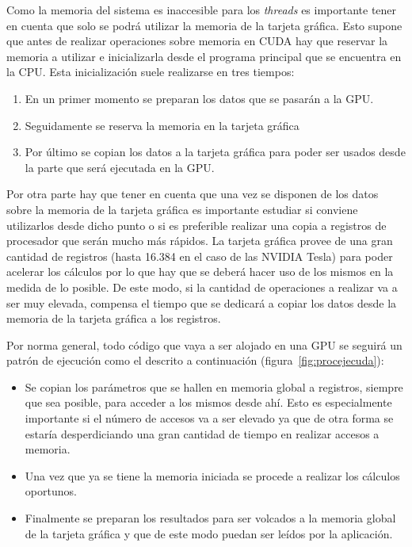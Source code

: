 Como la memoria del sistema es inaccesible para los \emph{threads} es importante tener en cuenta que solo se podrá utilizar la memoria de la tarjeta gráfica. Esto supone que antes de realizar operaciones sobre memoria en CUDA hay que reservar la memoria a utilizar e inicializarla desde el programa principal que se encuentra en la CPU. Esta inicialización suele realizarse en tres tiempos:

\begin{enumerate}
	\item En un primer momento se preparan los datos que se pasarán a la GPU.

	\item Seguidamente se reserva la memoria en la tarjeta gráfica

	\item Por último se copian los datos a la tarjeta gráfica para poder ser usados desde la parte que será ejecutada en la GPU.
\end{enumerate} 

Por otra parte hay que tener en cuenta que una vez se disponen de los datos sobre la memoria de la tarjeta gráfica es importante estudiar si conviene utilizarlos desde dicho punto o si es preferible realizar una copia a registros de procesador que serán mucho más rápidos. La tarjeta gráfica provee de una gran cantidad de registros (hasta 16.384 en el caso de las NVIDIA Tesla) para poder acelerar los cálculos por lo que hay que se deberá hacer uso de los mismos en la medida de lo posible. De este modo, si la cantidad de operaciones a realizar va a ser muy elevada, compensa el tiempo que se dedicará a copiar los datos desde la memoria de la tarjeta gráfica a los registros.

Por norma general, todo código que vaya a ser alojado en una GPU se seguirá un patrón de ejecución como el descrito a continuación (figura~\ref{fig:procejecuda}):

\begin{itemize}
	\item Se copian los parámetros que se hallen en memoria global a registros, siempre que sea posible, para acceder a los mismos desde ahí. Esto es especialmente importante si el número de accesos va a ser elevado ya que de otra forma se estaría desperdiciando una gran cantidad de tiempo en realizar accesos a memoria.
	\item Una vez que ya se tiene la memoria iniciada se procede a realizar los cálculos oportunos.
	\item Finalmente se preparan los resultados para ser volcados a la memoria global de la tarjeta gráfica y que de este modo puedan ser leídos por la aplicación.
\end{itemize}

